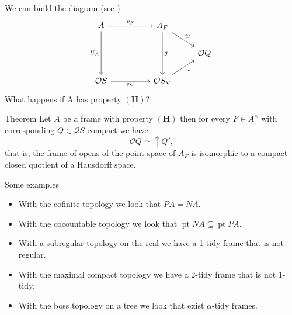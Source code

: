 \documentclass[compress,12pt]{beamer}
\DeclareMathOperator{\pt}{pt}
\begin{document}
\begin{frame}[fragile]
We can build the diagram (see \cite{H.S.V})
\[\begin{tikzcd}
	A && {A_F} \\
	&&& \mathcal{O}Q \\
	{\mathcal{O}S} && {\mathcal{O}S_\nabla}
	\arrow["{v_F}", from=1-1, to=1-3]
	\arrow["{U_A}"', from=1-1, to=3-1]
	\arrow["{\simeq }", from=1-3, to=2-4]
	\arrow["g", from=1-3, to=3-3]
	\arrow["{v_\nabla}"', from=3-1, to=3-3]
	\arrow["{\simeq }"', from=3-3, to=2-4]
\end{tikzcd}\]
What happens if A has property $\mathbf{(H)}$?

\end{frame}

\begin{frame}
\begin{block}{Theorem}
Let $A$ be a frame with property $\mathbf{(H)}$ then for every $F\in A^\wedge$ with corresponding $Q\in \mathcal{Q}S$ compact we have
\[
\mathcal{O}Q\simeq \uparrow{Q'},
\]
that is, the frame of opens of the point space of $A_F$ is isomorphic to a compact
closed quotient of a Hausdorff space.
\end{block}
\end{frame}

\begin{frame}{Some examples}
\begin{itemize}
\item With the cofinite topology we look that $PA= NA$.
\item With the cocountable topology we look that $\pt NA\subseteq \pt PA$.
\item With a subregular topology on the real we have a 1-tidy frame that is not regular. 
\item With the maximal compact topology we have a 2-tidy frame that is not 1-tidy.
\item With the boss topology on a tree we look that exist $\alpha$-tidy frames.
\end{itemize}
\end{frame}
\end{document}
